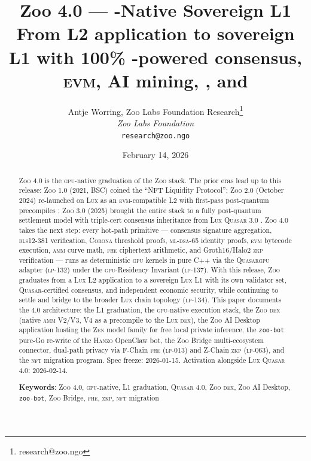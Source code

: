 \documentclass[11pt,letterpaper]{article}
\title{\textbf{Zoo 4.0 --- \GPU{}-Native Sovereign L1}\\
\large From \Lux{} L2 application to sovereign L1 with 100\%
\GPU{}-powered consensus, \textsc{evm}, AI mining, \DEX{}, and \FHE{}}
\author{
Antje Worring, Zoo Labs Foundation Research\thanks{research@zoo.ngo}\\
\textit{Zoo Labs Foundation}\\
\texttt{research@zoo.ngo}
}
\date{February 14, 2026}
\newcommand{\Zoo}{\textsc{Zoo}}
\newcommand{\Lux}{\textsc{Lux}}
\newcommand{\Hanzo}{\textsc{Hanzo}}
\newcommand{\Zen}{\textsc{Zen}}
\newcommand{\Quasar}{\textsc{Quasar}}
\newcommand{\QuasarGPU}{\textsc{Quasar}\textsc{gpu}}
\newcommand{\GPU}{\textsc{gpu}}
\newcommand{\AMM}{\textsc{amm}}
\newcommand{\DEX}{\textsc{dex}}
\newcommand{\NFT}{\textsc{nft}}
\newcommand{\FHE}{\textsc{fhe}}
\newcommand{\ZKP}{\textsc{zkp}}
\newcommand{\BLS}{\textsc{bls}}
\newcommand{\MLDSA}{\textsc{ml-dsa}}
\newcommand{\Corona}{\textsc{Corona}}
\begin{document}
\zoocoverpage

\begin{abstract}
\Zoo{} 4.0 is the \GPU{}-native graduation of the \Zoo{} stack. The
prior eras lead up to this release: \Zoo{} 1.0 (2021, BSC) coined the
``NFT Liquidity Protocol''; \Zoo{} 2.0 (October 2024) re-launched on
\Lux{} as an \textsc{evm}-compatible L2 with first-pass post-quantum
precompiles \cite{zoo-2-0}; \Zoo{} 3.0 (2025) brought the entire stack
to a fully post-quantum settlement model with triple-cert consensus
inheritance from \Lux{} \Quasar{} 3.0 \cite{zoo-3-0,lp-020}. \Zoo{} 4.0
takes the next step: every hot-path primitive --- consensus signature
aggregation, \BLS{}12-381 verification, \Corona{} threshold proofs,
\MLDSA{}-65 identity proofs, \textsc{evm} bytecode execution, \AMM{}
curve math, \FHE{} ciphertext arithmetic, and Groth16/Halo2 \ZKP{}
verification --- runs as deterministic \GPU{} kernels in pure C++ via
the \QuasarGPU{} adapter (\textsc{lp-132}) under the \GPU{}-Residency
Invariant (\textsc{lp-137}). With this release, \Zoo{} graduates from
a \Lux{} L2 application to a sovereign \Lux{} L1 with its own validator
set, \Quasar{}-certified consensus, and independent economic security,
while continuing to settle and bridge to the broader \Lux{} chain
topology (\textsc{lp-134}). This paper documents the 4.0 architecture:
the L1 graduation, the \GPU{}-native execution stack, the \Zoo{} \DEX{}
(native \AMM{} V2/V3, V4 as a precompile to the \Lux{} \DEX{}), the
\Zoo{} AI Desktop application hosting the \Zen{} model family for free
local private inference, the \texttt{zoo-bot} pure-Go re-write of the
\Hanzo{} OpenClaw bot, the \Zoo{} Bridge multi-ecosystem connector,
dual-path privacy via F-Chain \FHE{} (\textsc{lp-013}) and Z-Chain
\ZKP{} (\textsc{lp-063}), and the \NFT{} migration program. Spec
freeze: 2026-01-15. Activation alongside \Lux{} \Quasar{} 4.0:
2026-02-14.

\textbf{Keywords}: \Zoo{} 4.0, \GPU{}-native, L1 graduation, \Quasar{} 4.0, \Zoo{} \DEX{}, \Zoo{} AI Desktop, \texttt{zoo-bot}, \Zoo{} Bridge, \FHE{}, \ZKP{}, \NFT{} migration
\end{abstract}

\tableofcontents
\newpage













\end{document}
